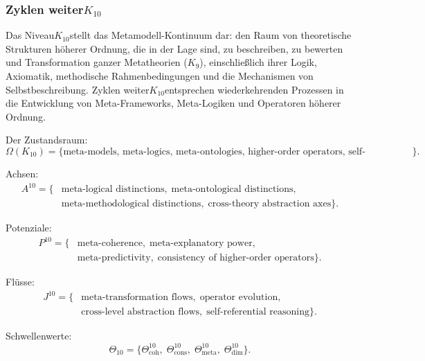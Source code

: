 
\subsubsection{Zyklen weiter$K_{10}$}
\label{sec:cycles-k10}

Das Niveau$K_{10}$stellt das Metamodell-Kontinuum dar: den Raum von
theoretische Strukturen höherer Ordnung, die in der Lage sind, zu beschreiben, zu bewerten und
Transformation ganzer Metatheorien ($K_9$), einschließlich ihrer Logik,
Axiomatik, methodische Rahmenbedingungen und die Mechanismen von
Selbstbeschreibung. Zyklen weiter$K_{10}$entsprechen wiederkehrenden Prozessen in
die Entwicklung von Meta-Frameworks, Meta-Logiken und Operatoren höherer Ordnung.

Der Zustandsraum:
\[
  \Omega(K_{10})
  = \{\text{meta-models, meta-logics, meta-ontologies,
      higher-order operators, self-descriptions}\}.
\]

Achsen:
\[
  \begin{aligned}
A^{10}
  = \{&
    \text{meta-logical distinctions},\;
    \text{meta-ontological distinctions},\\
    &\text{meta-methodological distinctions},\;
    \text{cross-theory abstraction axes}
  \}.
  \end{aligned}
\]

Potenziale:
\[
  \begin{aligned}
P^{10}
   = \{&
      \text{meta-coherence},\;
      \text{meta-explanatory power},\\
      &\text{meta-predictivity},\;
      \text{consistency of higher-order operators}
    \}.
  \end{aligned}
\]

Flüsse:
\[
  \begin{aligned}
J^{10}
   = \{&
       \text{meta-transformation flows},\;
       \text{operator evolution},\\
       &\text{cross-level abstraction flows},\;
       \text{self-referential reasoning}
     \}.
  \end{aligned}
\]

Schwellenwerte:
\[
  \Theta_{10}
  = \{
       \Theta^{10}_\mathrm{coh},\;
       \Theta^{10}_\mathrm{cons},\;
       \Theta^{10}_\mathrm{meta},\;
       \Theta^{10}_\mathrm{dim}
    \}.
\]

